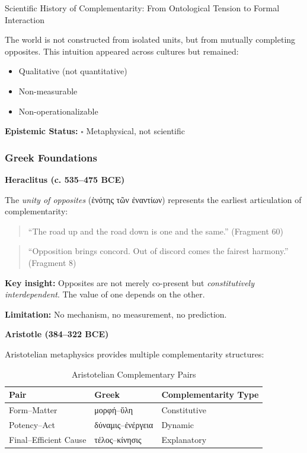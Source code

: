 \begin{chapter}{Scientific History of Complementarity: From Ontological Tension to Formal Interaction}
\begin{tcolorbox}[colback=purple!5!white,colframe=purple!75!black,title=\textbf{Core Thesis}]
The world is not constructed from isolated units, but from mutually completing opposites. This intuition appeared across cultures but remained:
\begin{itemize}[noitemsep]
    \item Qualitative (not quantitative)
    \item Non-measurable
    \item Non-operationalizable
\end{itemize}
\textbf{Epistemic Status:} $\square$ Metaphysical, not scientific
\end{tcolorbox}

\subsubsection{Greek Foundations}

\textbf{Heraclitus (c. 535--475 BCE)}

The \textit{unity of opposites} (\textgreek{ἑνότης τῶν ἐναντίων}) represents the earliest articulation of complementarity:

\begin{quote}
``The road up and the road down is one and the same.'' (Fragment 60)
\end{quote}

\begin{quote}
``Opposition brings concord. Out of discord comes the fairest harmony.'' (Fragment 8)
\end{quote}

\textbf{Key insight:} Opposites are not merely co-present but \textit{constitutively interdependent}. The value of one depends on the other.

\textbf{Limitation:} No mechanism, no measurement, no prediction.

\vspace{0.5em}
\textbf{Aristotle (384--322 BCE)}

Aristotelian metaphysics provides multiple complementarity structures:

\begin{table}[h]
\centering
\caption{Aristotelian Complementary Pairs}
\label{tab:aristotle-pairs}
\renewcommand{\arraystretch}{1.2}
\begin{tabular}{@{}lll@{}}
\toprule
\textbf{Pair} & \textbf{Greek} & \textbf{Complementarity Type} \\
\midrule
Form--Matter & \textgreek{μορφή}--\textgreek{ὕλη} & Constitutive \\
Potency--Act & \textgreek{δύναμις}--\textgreek{ἐνέργεια} & Dynamic \\
Final--Efficient Cause & \textgreek{τέλος}--\textgreek{κίνησις} & Explanatory \\
\bottomrule
\end{tabular}
\end{table}


\end{chapter}
